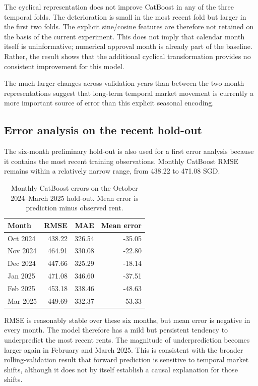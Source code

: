 \documentclass[10pt]{article}
\begin{document}
The cyclical representation does not improve CatBoost in any of the three temporal folds.
The deterioration is small in the most recent fold but larger in the first two folds.
The explicit sine/cosine features are therefore not retained on the basis of the current experiment.
This does not imply that calendar month itself is uninformative; numerical approval month is already part of the baseline.
Rather, the result shows that the additional cyclical transformation provides no consistent improvement for this model.

The much larger changes across validation years than between the two month representations suggest that long-term temporal market movement is currently a more important source of error than this explicit seasonal encoding.

\subsection{Error analysis on the recent hold-out}

The six-month preliminary hold-out is also used for a first error analysis because it contains the most recent training observations.
Monthly CatBoost RMSE remains within a relatively narrow range, from 438.22 to 471.08 SGD.

\begin{table}[h]
\centering
\small
\begin{tabular}{lrrr}
\toprule
Month & RMSE & MAE & Mean error \\
\midrule
Oct 2024 & 438.22 & 326.54 & -35.05 \\
Nov 2024 & 464.91 & 330.08 & -22.80 \\
Dec 2024 & 447.66 & 325.29 & -18.14 \\
Jan 2025 & 471.08 & 346.60 & -37.51 \\
Feb 2025 & 453.18 & 338.46 & -48.63 \\
Mar 2025 & 449.69 & 332.37 & -53.33 \\
\bottomrule
\end{tabular}
\caption{Monthly CatBoost errors on the October 2024--March 2025 hold-out. Mean error is prediction minus observed rent.}
\label{tab:monthly-errors}
\end{table}

RMSE is reasonably stable over these six months, but mean error is negative in every month.
The model therefore has a mild but persistent tendency to underpredict the most recent rents.
The magnitude of underprediction becomes larger again in February and March 2025.
This is consistent with the broader rolling-validation result that forward prediction is sensitive to temporal market shifts, although it does not by itself establish a causal explanation for those shifts.
\end{document}
